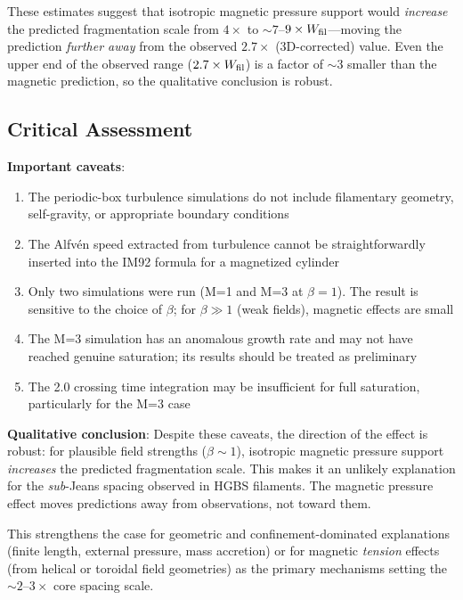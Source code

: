 \documentclass[11pt,a4paper]{article}
\begin{document}
These estimates suggest that isotropic magnetic pressure support would \textit{increase} the predicted fragmentation scale from $4\times$ to $\sim7$--$9\times W_{\rm fil}$—moving the prediction \textit{further away} from the observed $2.7\times$ (3D-corrected) value. Even the upper end of the observed range ($2.7\times W_{\rm fil}$) is a factor of $\sim3$ smaller than the magnetic prediction, so the qualitative conclusion is robust.

\subsection{Critical Assessment}

\textbf{Important caveats}:
\begin{enumerate}
    \item The periodic-box turbulence simulations do not include filamentary geometry, self-gravity, or appropriate boundary conditions
    \item The Alfv\'en speed extracted from turbulence cannot be straightforwardly inserted into the IM92 formula for a magnetized cylinder
    \item Only two simulations were run (M=1 and M=3 at $\beta=1$). The result is sensitive to the choice of $\beta$; for $\beta \gg 1$ (weak fields), magnetic effects are small
    \item The M=3 simulation has an anomalous growth rate and may not have reached genuine saturation; its results should be treated as preliminary
    \item The 2.0 crossing time integration may be insufficient for full saturation, particularly for the M=3 case
\end{enumerate}

\textbf{Qualitative conclusion}: Despite these caveats, the direction of the effect is robust: for plausible field strengths ($\beta \sim 1$), isotropic magnetic pressure support \textit{increases} the predicted fragmentation scale. This makes it an unlikely explanation for the \textit{sub}-Jeans spacing observed in HGBS filaments. The magnetic pressure effect moves predictions away from observations, not toward them.

This strengthens the case for geometric and confinement-dominated explanations (finite length, external pressure, mass accretion) or for magnetic \textit{tension} effects (from helical or toroidal field geometries) as the primary mechanisms setting the $\sim2$--$3\times$ core spacing scale.
\end{document}
